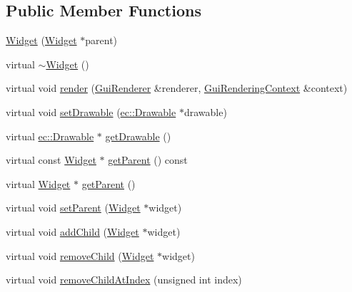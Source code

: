 \subsection*{Public Member Functions}
\begin{DoxyCompactItemize}
\item 
\mbox{\hyperlink{classec__gui_1_1_widget_a9371f37c8a4825bc11058c0624641575}{Widget}} (\mbox{\hyperlink{classec__gui_1_1_widget}{Widget}} $\ast$parent)
\item 
virtual \mbox{\hyperlink{classec__gui_1_1_widget_a4e74d028fcbbb8b939f5017d3052578e}{$\sim$\+Widget}} ()
\item 
virtual void \mbox{\hyperlink{classec__gui_1_1_widget_ade9b99741eb922b24f8328509483f129}{render}} (\mbox{\hyperlink{classec__gui_1_1_gui_renderer}{Gui\+Renderer}} \&renderer, \mbox{\hyperlink{classec__gui_1_1_gui_rendering_context}{Gui\+Rendering\+Context}} \&context)
\item 
virtual void \mbox{\hyperlink{classec__gui_1_1_widget_a5919d406bf95a17160a073dac9b37bbe}{set\+Drawable}} (\mbox{\hyperlink{classec_1_1_drawable}{ec\+::\+Drawable}} $\ast$drawable)
\item 
virtual \mbox{\hyperlink{classec_1_1_drawable}{ec\+::\+Drawable}} $\ast$ \mbox{\hyperlink{classec__gui_1_1_widget_a80b5adaf63ac57dd14c39414a77b8688}{get\+Drawable}} ()
\item 
virtual const \mbox{\hyperlink{classec__gui_1_1_widget}{Widget}} $\ast$ \mbox{\hyperlink{classec__gui_1_1_widget_a5e3c66d2a014f95603330cf11806e02a}{get\+Parent}} () const
\item 
virtual \mbox{\hyperlink{classec__gui_1_1_widget}{Widget}} $\ast$ \mbox{\hyperlink{classec__gui_1_1_widget_abb118b1c0ba11115f85280990564db6d}{get\+Parent}} ()
\item 
virtual void \mbox{\hyperlink{classec__gui_1_1_widget_a9831433c88e5aff6f185302d62b6726c}{set\+Parent}} (\mbox{\hyperlink{classec__gui_1_1_widget}{Widget}} $\ast$widget)
\item 
virtual void \mbox{\hyperlink{classec__gui_1_1_widget_a089877f93123b630011be58624c5d8cf}{add\+Child}} (\mbox{\hyperlink{classec__gui_1_1_widget}{Widget}} $\ast$widget)
\item 
virtual void \mbox{\hyperlink{classec__gui_1_1_widget_a446a7ef5cb4b1bc35c75f909dbac4a06}{remove\+Child}} (\mbox{\hyperlink{classec__gui_1_1_widget}{Widget}} $\ast$widget)
\item 
virtual void \mbox{\hyperlink{classec__gui_1_1_widget_a05ad16c193da23b6689671b5947fc84e}{remove\+Child\+At\+Index}} (unsigned int index)

\end{DoxyCompactItemize}
